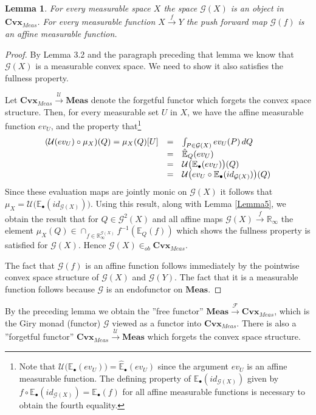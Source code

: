 \documentclass[11pt]{amsart}    %
\newtheorem{lemma}{Lemma}
\newcommand{\be}{\begin{equation}}
\newcommand{\ee}{\end{equation}}
\newcommand{\G}{\mathcal{G}}
\begin{document}
\begin{lemma}
For every measurable space $X$ the space  $\G(X)$ is an object in $\mathbf{Cvx}_{Meas}$.  For every measurable function $X \xrightarrow{f} Y$ the push forward map $\G(f)$ is an affine measurable function.
\end{lemma}
\begin{proof} By Lemma 3.2 and the paragraph preceding that lemma we know that $\G(X)$ is a measurable convex space. We need to show it also satisfies the fullness property.
 
Let  $\mathbf{Cvx}_{Meas} \xrightarrow{\mathcal{U}} \mathbf{Meas}$ denote the forgetful functor which forgets the convex space structure.  Then, for every measurable set $U$ in $X$, we have the affine measurable function $ev_U$, and the property that\footnote{Note that $\mathcal{U}\big( \mathbb{E}_{\bullet}(ev_U) \big) = \hat{ \mathbb{E}}_{\bullet}(ev_U)$ since the argument $ev_U$ is an affine measurable function.   The defining property of $\mathbb{E}_{\bullet}(id_{\G(X)})$ given by $f \circ \mathbb{E}_{\bullet}(id_{\G(X)}) =\mathbb{E}_{\bullet}(f)$ for all affine measurable functions is necessary to obtain the fourth equality.   }
\be
\begin{array}{lcl}
(\mathcal{U}(ev_U) \circ \mu_X)(Q) = \mu_X(Q)[U] &=& \int_{P \in \G(X)} ev_U(P) \, dQ \\
& =& \hat{\mathbb{E}}_Q(ev_U) \\
&=& \mathcal{U}\big(\mathbb{E}_{\bullet}(ev_{\tiny{U}})\big)(Q) \\
&=&  \mathcal{U} \big(ev_U \circ \mathbb{E}_{\bullet}(id_{\G(X)})\big)(Q)
\end{array}
\ee
Since these evaluation maps are jointly monic on $\G(X)$ it follows that $\mu_X =  \mathcal{U}\big(\mathbb{E}_{\bullet}(id_{\G(X)})\big)$.   
Using this result, along with Lemma \ref{Lemma5}, we obtain the result that for $Q \in \G^2(X)$ and all affine maps $\G(X) \xrightarrow{f} \mathbb{R}_{\infty}$ the element \mbox{$\mu_X(Q) \in \cap_{f \in \mathbb{R}_{\infty}^{\G(X)}} f^{-1}(\mathbb{E}_Q(f))$} which shows the fullness property is satisfied for $\G(X)$. 
Hence  $\G(X) \in_{ob} \mathbf{Cvx}_{Meas}$.

The fact that $\G(f)$ is an affine function follows immediately by the pointwise convex space structure of $\G(X)$ and $\G(Y)$.  The fact that it is a measurable function follows because $\G$ is an endofunctor on $\mathbf{Meas}$. 
\end{proof}


By the preceding lemma we obtain  the ''free functor'' $\mathbf{Meas} \xrightarrow{\mathcal{F}} \mathbf{Cvx}_{Meas}$, which is the Giry monad (functor) $\G$ viewed as a functor into $\mathbf{Cvx}_{Meas}$. There is also a ''forgetful functor'' $\mathbf{Cvx}_{Meas}  \xrightarrow{\mathcal{U}} \mathbf{Meas}$ which forgets the convex space structure.  
\end{document}
